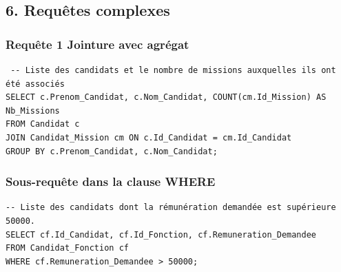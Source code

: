 \documentclass[a4paper,12pt]{article}
\begin{document}
\begin{verbatim}
\end{verbatim}
 \subsection*{6. Requêtes complexes}
 \subsubsection*{Requête 1 Jointure avec agrégat }
 \begin{verbatim}
 -- Liste des candidats et le nombre de missions auxquelles ils ont été associés
SELECT c.Prenom_Candidat, c.Nom_Candidat, COUNT(cm.Id_Mission) AS Nb_Missions
FROM Candidat c
JOIN Candidat_Mission cm ON c.Id_Candidat = cm.Id_Candidat
GROUP BY c.Prenom_Candidat, c.Nom_Candidat;
\end{verbatim}
\subsubsection*{Sous-requête dans la clause WHERE}
\begin{verbatim}
-- Liste des candidats dont la rémunération demandée est supérieure 50000.
SELECT cf.Id_Candidat, cf.Id_Fonction, cf.Remuneration_Demandee
FROM Candidat_Fonction cf
WHERE cf.Remuneration_Demandee > 50000;
\end{verbatim}
\end{document}
